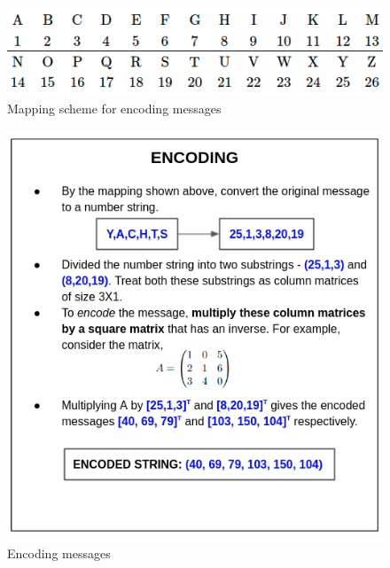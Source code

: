 \documentclass[titlepage, 11pt]{article}
\begin{document}
\begin{figure}[h]
    \centering
    \includegraphics[scale = 0.5]{mapping.png}
    \caption{Mapping scheme for encoding messages}
    \label{fig:map}
\end{figure}

\begin{figure}[h]
    \centering
    \includegraphics[scale = 0.55]{enc.png}
    \caption{Encoding messages}
    \label{fig:enc}
\end{figure}
\end{document}
